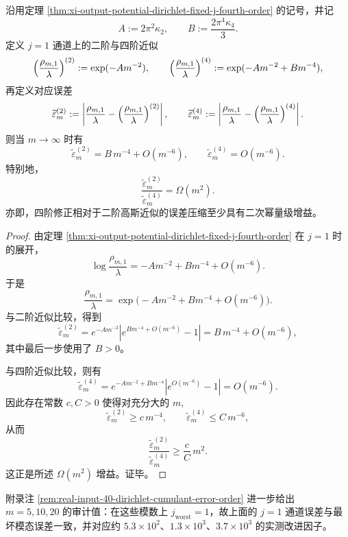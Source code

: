 \begin{theorem}[四阶修正相对二阶近似的二次量级增益]\label{thm:xi-output-potential-dirichlet-fourth-order-gain}
沿用定理 \ref{thm:xi-output-potential-dirichlet-fixed-j-fourth-order} 的记号，并记
\[
A:=2\pi^2\kappa_2,
\qquad
B:=\frac{2\pi^4\kappa_4}{3}.
\]
定义 \(j=1\) 通道上的二阶与四阶近似
\[
\Bigl(\frac{\rho_{m,1}}{\lambda}\Bigr)^{(2)}
:=
\exp(-A m^{-2}),
\qquad
\Bigl(\frac{\rho_{m,1}}{\lambda}\Bigr)^{(4)}
:=
\exp(-A m^{-2}+B m^{-4}),
\]
再定义对应误差
\[
\widetilde\varepsilon_m^{(2)}
:=
\left\lvert
\frac{\rho_{m,1}}{\lambda}
-\Bigl(\frac{\rho_{m,1}}{\lambda}\Bigr)^{(2)}
\right\rvert,
\qquad
\widetilde\varepsilon_m^{(4)}
:=
\left\lvert
\frac{\rho_{m,1}}{\lambda}
-\Bigl(\frac{\rho_{m,1}}{\lambda}\Bigr)^{(4)}
\right\rvert.
\]
则当 \(m\to\infty\) 时有
\[
\boxed{\;
\widetilde\varepsilon_m^{(2)}=B\,m^{-4}+O(m^{-6}),
\qquad
\widetilde\varepsilon_m^{(4)}=O(m^{-6}).\;}
\]
特别地，
\[
\boxed{\;
\frac{\widetilde\varepsilon_m^{(2)}}{\widetilde\varepsilon_m^{(4)}}=\Omega(m^2).\;}
\]
亦即，四阶修正相对于二阶高斯近似的误差压缩至少具有二次幂量级增益。
\end{theorem}
\begin{proof}
由定理 \ref{thm:xi-output-potential-dirichlet-fixed-j-fourth-order} 在 \(j=1\) 时的展开，
\[
\log\frac{\rho_{m,1}}{\lambda}
=
-A m^{-2}+B m^{-4}+O(m^{-6}).
\]
于是
\[
\frac{\rho_{m,1}}{\lambda}
=
\exp\!\bigl(-A m^{-2}+B m^{-4}+O(m^{-6})\bigr).
\]
与二阶近似比较，得到
\[
\widetilde\varepsilon_m^{(2)}
=
e^{-A m^{-2}}
\left|e^{B m^{-4}+O(m^{-6})}-1\right|
=
B\,m^{-4}+O(m^{-6}),
\]
其中最后一步使用了 \(B>0\)。

与四阶近似比较，则有
\[
\widetilde\varepsilon_m^{(4)}
=
e^{-A m^{-2}+B m^{-4}}
\left|e^{O(m^{-6})}-1\right|
=
O(m^{-6}).
\]
因此存在常数 \(c,C>0\) 使得对充分大的 \(m\),
\[
\widetilde\varepsilon_m^{(2)}\ge c\,m^{-4},
\qquad
\widetilde\varepsilon_m^{(4)}\le C\,m^{-6},
\]
从而
\[
\frac{\widetilde\varepsilon_m^{(2)}}{\widetilde\varepsilon_m^{(4)}}
\ge
\frac{c}{C}\,m^2.
\]
这正是所述 \(\Omega(m^2)\) 增益。证毕。
\end{proof}
\noindent 附录注 \ref{rem:real-input-40-dirichlet-cumulant-error-order} 进一步给出 \(m=5,10,20\) 的审计值：在这些模数上 \(j_{\mathrm{worst}}=1\)，故上面的 \(j=1\) 通道误差与最坏模态误差一致，并对应约 \(5.3\times 10^2\)、\(1.3\times 10^3\)、\(3.7\times 10^3\) 的实测改进因子。





